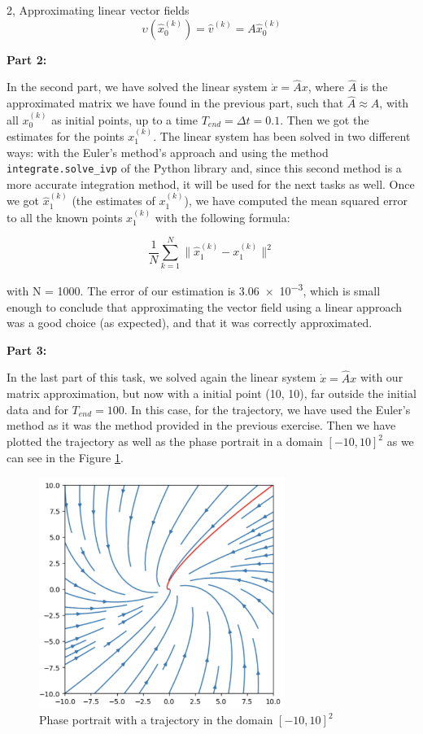 \documentclass[10pt,a4paper]{article}
\begin{document}
\begin{task}{2, Approximating linear vector fields}
\begin{equation}\label{k}
    \upsilon (\hat{x}^{(k)}_{0}) = \hat{v}^{(k)} = A \hat{x}^{(k)}_{0}
\end{equation}

\noindent \textbf{Part 2:} 

In the second part, we have solved the linear system $\dot{x} = \hat{A} x$, where $\hat{A}$ is the approximated matrix we have found in the previous part, such that $\hat{A} \approx A$, with all ${x}^{(k)}_{0}$ as initial points, up to a time $T_{end} = \Delta t = 0.1$. Then we got the estimates for the points $x^{(k)}_{1}$. The linear system has been solved in two different ways: with the Euler's method's approach and using the method \texttt{integrate.solve\_ivp} of the Python library and, since this second method is a more accurate integration method, it will be used for the next tasks as well. Once we got $\hat{x}^{(k)}_{1}$ (the estimates of $x^{(k)}_{1}$), we have computed the mean squared error to all the known points $x^{(k)}_{1}$ with the following formula:

\begin{equation}\label{mse}
    \frac{1}{N} \sum_{k=1}^{N} \| \hat{x}^{(k)}_{1} - x^{(k)}_{1} \| ^ {2}
\end{equation}

\noindent with N = 1000. The error of our estimation is \num{3.06e-3}, which is small enough to conclude that approximating the vector field using a linear approach was a good choice (as expected), and that it was correctly approximated.

\newpage

\noindent \textbf{Part 3:} 

In the last part of this task, we solved again the linear system $\dot{x} = \hat{A} x$ with our matrix approximation, but now with a initial point (10, 10), far outside the initial data and for $T_{end} = 100$. In this case, for the trajectory, we have used the Euler's method as it was the method provided in the previous exercise. Then we have plotted the trajectory as well as the phase portrait in a domain $[-10, 10]^{2}$ as we can see in the Figure \ref{pahse_portrait}. 

\begin{figure}[H]
    \centering
    \includegraphics[width=8cm]{images/phase_portrait.png}
    \caption{Phase portrait with a trajectory in the domain $[-10, 10]^{2}$}
    \label{pahse_portrait}
\end{figure}


\end{task}
\end{document}
